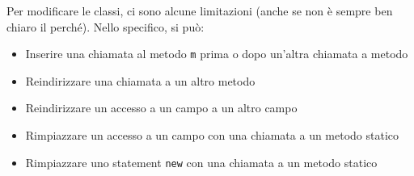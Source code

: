 Per modificare le classi, ci sono alcune limitazioni (anche se non è sempre ben chiaro il perché). Nello specifico, si può:
\begin{itemize}
    \item Inserire una chiamata al metodo \texttt{m} prima o dopo un'altra chiamata a metodo

    \item Reindirizzare una chiamata a un altro metodo

    \item Reindirizzare un accesso a un campo a un altro campo

    \item Rimpiazzare un accesso a un campo con una chiamata a un metodo statico

    \item Rimpiazzare uno statement \texttt{new} con una chiamata a un metodo statico
\end{itemize}







